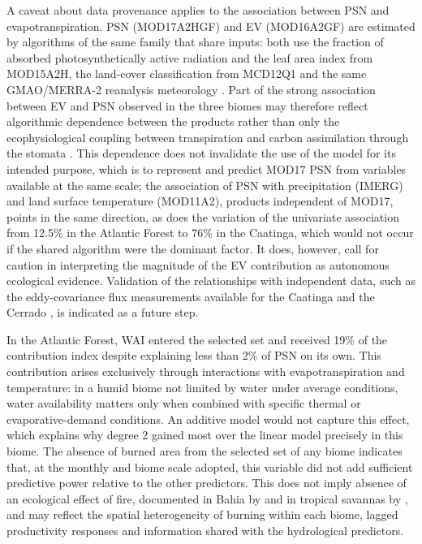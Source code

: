 \documentclass[a4paper,fleqn]{cas-dc}
\begin{document}
A caveat about data provenance applies to the association between PSN and evapotranspiration. PSN (MOD17A2HGF) and EV (MOD16A2GF) are estimated by algorithms of the same family that share inputs: both use the fraction of absorbed photosynthetically active radiation and the leaf area index from MOD15A2H, the land-cover classification from MCD12Q1 and the same GMAO/MERRA-2 reanalysis meteorology \citep{running2004,running2021gpp,running2021et}. Part of the strong association between EV and PSN observed in the three biomes may therefore reflect algorithmic dependence between the products rather than only the ecophysiological coupling between transpiration and carbon assimilation through the stomata \citep{lawson2019}. This dependence does not invalidate the use of the model for its intended purpose, which is to represent and predict MOD17 PSN from variables available at the same scale; the association of PSN with precipitation (IMERG) and land surface temperature (MOD11A2), products independent of MOD17, points in the same direction, as does the variation of the univariate association from 12.5\% in the Atlantic Forest to 76\% in the Caatinga, which would not occur if the shared algorithm were the dominant factor. It does, however, call for caution in interpreting the magnitude of the EV contribution as autonomous ecological evidence. Validation of the relationships with independent data, such as the eddy-covariance flux measurements available for the Caatinga \citep{mendes2020,mendes2025} and the Cerrado \citep{vourlitis2022}, is indicated as a future step.

In the Atlantic Forest, WAI entered the selected set and received 19\% of the contribution index despite explaining less than 2\% of PSN on its own. This contribution arises exclusively through interactions with evapotranspiration and temperature: in a humid biome not limited by water under average conditions, water availability matters only when combined with specific thermal or evaporative-demand conditions. An additive model would not capture this effect, which explains why degree 2 gained most over the linear model precisely in this biome. The absence of burned area from the selected set of any biome indicates that, at the monthly and biome scale adopted, this variable did not add sufficient predictive power relative to the other predictors. This does not imply absence of an ecological effect of fire, documented in Bahia by \citet{benfica2022,benfica2023} and in tropical savannas by \citet{navarro2025}, and may reflect the spatial heterogeneity of burning within each biome, lagged productivity responses and information shared with the hydrological predictors.
\end{document}
